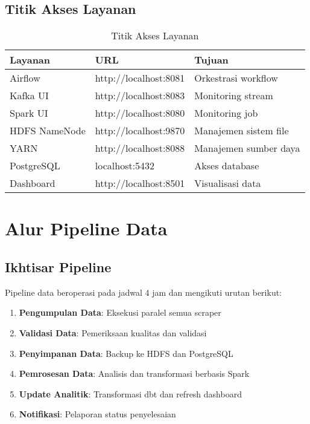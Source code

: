 \documentclass[12pt,a4paper]{article}
\begin{document}
\subsection{Titik Akses Layanan}

\begin{table}[H]
\centering
\begin{tabular}{|l|l|l|}
\hline
\textbf{Layanan} & \textbf{URL} & \textbf{Tujuan} \\
\hline
Airflow & http://localhost:8081 & Orkestrasi workflow \\
\hline
Kafka UI & http://localhost:8083 & Monitoring stream \\
\hline
Spark UI & http://localhost:8080 & Monitoring job \\
\hline
HDFS NameNode & http://localhost:9870 & Manajemen sistem file \\
\hline
YARN & http://localhost:8088 & Manajemen sumber daya \\
\hline
PostgreSQL & localhost:5432 & Akses database \\
\hline
Dashboard & http://localhost:8501 & Visualisasi data \\
\hline
\end{tabular}
\caption{Titik Akses Layanan}
\label{tab:service-access}
\end{table}

\section{Alur Pipeline Data}

\subsection{Ikhtisar Pipeline}
Pipeline data beroperasi pada jadwal 4 jam dan mengikuti urutan berikut:

\begin{enumerate}
    \item \textbf{Pengumpulan Data}: Eksekusi paralel semua scraper
    \item \textbf{Validasi Data}: Pemeriksaan kualitas dan validasi
    \item \textbf{Penyimpanan Data}: Backup ke HDFS dan PostgreSQL
    \item \textbf{Pemrosesan Data}: Analisis dan transformasi berbasis Spark
    \item \textbf{Update Analitik}: Transformasi dbt dan refresh dashboard
    \item \textbf{Notifikasi}: Pelaporan status penyelesaian
\end{enumerate}
\end{document}

